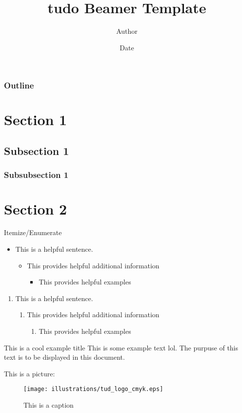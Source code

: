\documentclass[aspectratio=169, 12pt]{beamer}
\title{tudo Beamer Template}
\author{Author }
\institute[Short Institute]{
    Institute
}
\date{Date}
\begin{document}
    \begin{frame}
        \titlepage
    \end{frame}
    \begin{frame}
        \frametitle{Outline}
        \tableofcontents
    \end{frame}
    \section{Section 1}
    \subsection{Subsection 1}
    \subsubsection{Subsubsection 1}
    \section{Section 2}
    \begin{frame}{Itemize/Enumerate}
        \begin{itemize}
            \item This is a helpful sentence.
            \begin{itemize}
                \item This provides helpful additional information 
                \begin{itemize}
                    \item This provides helpful examples
                \end{itemize}
            \end{itemize}
        \end{itemize}
        \begin{enumerate}
            \item This is a helpful sentence.
            \begin{enumerate}
                \item This provides helpful additional information 
                \begin{enumerate}
                    \item This provides helpful examples
                \end{enumerate}
            \end{enumerate}
        \end{enumerate}
    \end{frame}
    \begin{frame}{This is a cool example title}
    This is some example text lol. The purpuse of this text is to be displayed in this document.
    
    This is a picture:
    \begin{figure}
        \centering
        \texttt{[image: illustrations/tud\_logo\_cmyk.eps]}
        \caption{This is a caption}
        \label{fig:enter-label}
    \end{figure}
    \end{frame}
\end{document}
